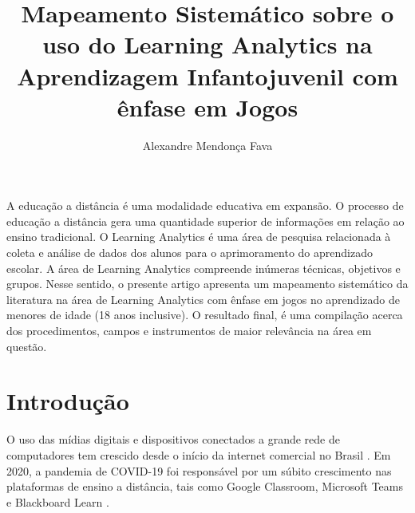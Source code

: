\documentclass[12pt]{article}
\title{Mapeamento Sistemático sobre o uso do Learning Analytics na Aprendizagem Infantojuvenil com ênfase em Jogos}
\author{Alexandre Mendonça Fava\inst{1}}
\begin{document}
 

\maketitle

\begin{resumo} 
A educação a distância é uma modalidade educativa em expansão. O processo de educação a distância gera uma quantidade superior de informações em relação ao ensino tradicional. O Learning Analytics é uma área de pesquisa relacionada à coleta e análise de dados dos alunos para o aprimoramento do aprendizado escolar. A área de Learning Analytics compreende inúmeras técnicas, objetivos e grupos. Nesse sentido, o presente artigo apresenta um mapeamento sistemático da literatura na área de Learning Analytics com ênfase em jogos no aprendizado de menores de idade (18 anos inclusive). O resultado final, é uma compilação acerca dos procedimentos, campos e instrumentos de maior relevância na área em questão.
\end{resumo}


\section{Introdução}\label{secao:introducao}

O uso das mídias digitais e dispositivos conectados a grande rede de computadores tem crescido desde o início da internet comercial no Brasil \cite{barbosa2019pesquisa}. %
Em 2020, a pandemia de COVID-19 foi responsável por um súbito crescimento nas plataformas de ensino a distância, tais como Google Classroom, Microsoft Teams e Blackboard Learn \cite{da2020inventar}. %
\end{document}
